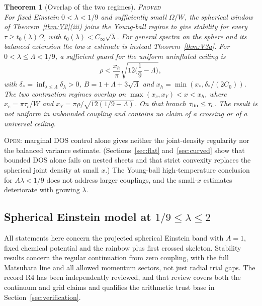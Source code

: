 \documentclass[11pt]{article}
\newcommand{\PROVED}{\upshape\mdseries\textsc{Proved}}
\newcommand{\OPEN}{\upshape\mdseries\textsc{Open}}
\newcommand{\Cinf}{C_\infty}
\newtheorem{theorem}{Theorem}[section]
\theoremstyle{definition}
\theoremstyle{remark}
\begin{document}
\begin{theorem}[Overlap of the two regimes]\label{thm:B2}\hfill\PROVED\\
For fixed Einstein $0<\lambda<1/9$ and sufficiently small $\Omega/W$, the spherical window of Theorem~\ref{thm:V2}(iii) joins the Young-ball regime to give stability for every $\tau\ge t_0(\lambda)\Omega$, with $t_0(\lambda)<\Cinf\sqrt\lambda$. For general spectra on the sphere and its balanced extension the low-$x$ estimate is instead Theorem~\ref{thm:V3a}. For $0<\lambda\le\Lambda<1/9$, a sufficient guard for the uniform uninflated ceiling is
\begin{equation}\label{eq:B2}
\rho<\frac{x_h}{\pi}\sqrt{12\Big(\frac19-\Lambda\Big)},
\end{equation}
with $\delta_*=\inf_{\lambda\le\Lambda}\delta_\lambda>0$, $B=1+\Lambda+3\sqrt\Lambda$ and $x_h=\min(x_*,\delta_*/(2C_0))$. The two contraction regimes overlap on $\max(x_c,x_Y)<x<x_h$, where $x_c=\pi\tau_c/W$ and $x_Y=\pi\rho/\sqrt{12(1/9-\Lambda)}$. On that branch $\tau_{\rm lin}\le\tau_c$. The result is not uniform in unbounded coupling and contains no claim of a crossing or of a universal ceiling.
\end{theorem}

\noindent\OPEN: marginal DOS control alone gives neither the joint-density regularity nor the balanced variance estimate. (Sections~\ref{sec:flat} and~\ref{sec:curved} show that bounded DOS alone fails on nested sheets and that strict convexity replaces the spherical joint density at small $x$.) The Young-ball high-temperature conclusion for $A\lambda<1/9$ does not address larger couplings, and the small-$x$ estimates deteriorate with growing $\lambda$.

\subsection{Spherical Einstein model at \texorpdfstring{$1/9\le\lambda\le2$}{couplings from 1/9 to 2}}

All statements here concern the projected spherical Einstein band with $A=1$, fixed chemical potential and the rainbow plus first crossed skeleton. Stability results concern the regular continuation from zero coupling, with the full Matsubara line and all allowed momentum sectors, not just radial trial gaps. The record R4 has been independently reviewed, and that review covers both the continuum and grid claims and qualifies the arithmetic trust base in Section~\ref{sec:verification}.
\end{document}
